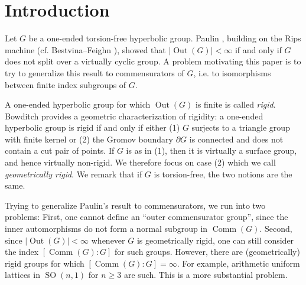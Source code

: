 \documentclass{amsart}
\numberwithin{equation}{section}
\theoremstyle{definition}
\DeclareMathOperator{\SO}{SO}
\DeclareMathOperator{\Out}{Out}
\DeclareMathOperator{\Comm}{Comm}
\begin{document}

\section{Introduction}

Let $G$ be a one-ended torsion-free hyperbolic group. 
Paulin \cite{paulin1991outer}, building on the Rips machine (cf. Bestvina--Feighn \cite{bestvina1995stable}), showed that  $|\Out(G)|<\infty$ if and only if $G$ does not split over a virtually cyclic group.
 A  problem motivating this paper is to try to generalize this result to commensurators of $G$, i.e. to isomorphisms between finite index subgroups of $G$.


A one-ended hyperbolic group for which $\Out(G)$ is finite is called  \emph{rigid}. 
Bowditch \cite{bowditchjsj} provides a geometric characterization of rigidity: a one-ended hyperbolic group is rigid if and only if either (1) $G$ surjects to a triangle group with finite kernel or (2) the Gromov boundary $\partial G$ is connected and does not contain a cut pair of points.
If $G$ is as in (1), then it is virtually a surface group, and hence virtually non-rigid. 
We therefore focus on case (2) which we call \emph{geometrically rigid}. 
We remark that if $G$ is torsion-free, the two notions are the same.

Trying to generalize Paulin's result to commensurators,  we run into two problems:
First, one cannot define an ``outer commensurator group'', since the inner automorphisms do not form a normal subgroup in $\Comm(G)$. 
Second, since $|\Out(G)| < \infty$ whenever $G$ is geometrically rigid, one can
still consider the index $[\Comm(G):G]$
for such groups. However, 
there are (geometrically) rigid groups for which $[\Comm(G):G] = \infty$.
For example, arithmetic uniform lattices in $\SO(n,1)$ for $n\ge 3$ are such.
This is a more substantial problem.
\end{document}
